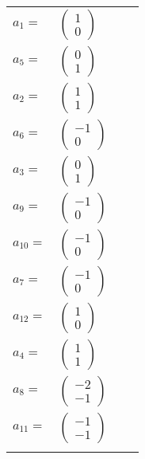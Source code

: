 \documentclass[1p]{elsarticle_modified}
\theoremstyle{definition}
\begin{document}
\begin{tabular}{m{7pt} m{180pt} m{7pt} m{180pt} }
\flushright $a_{1}=$&$\begin{pmatrix}1\\0\end{pmatrix}$ \\
\flushright $a_{5}=$&$\begin{pmatrix}0\\1\end{pmatrix}$ \\
\flushright $a_{2}=$&$\begin{pmatrix}1\\1\end{pmatrix}$ \\
\flushright $a_{6}=$&$\begin{pmatrix}-1\\0\end{pmatrix}$ \\
\flushright $a_{3}=$&$\begin{pmatrix}0\\1\end{pmatrix}$ \\
\flushright $a_{9}=$&$\begin{pmatrix}-1\\0\end{pmatrix}$ \\
\flushright $a_{10}=$&$\begin{pmatrix}-1\\0\end{pmatrix}$ \\
\flushright $a_{7}=$&$\begin{pmatrix}-1\\0\end{pmatrix}$ \\
\flushright $a_{12}=$&$\begin{pmatrix}1\\0\end{pmatrix}$ \\
\flushright $a_{4}=$&$\begin{pmatrix}1\\1\end{pmatrix}$ \\
\flushright $a_{8}=$&$\begin{pmatrix}-2\\-1\end{pmatrix}$ \\
\flushright $a_{11}=$&$\begin{pmatrix}-1\\-1\end{pmatrix}$\\&\end{tabular}
\end{document}
